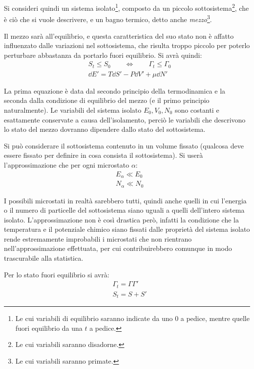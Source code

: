 Si consideri quindi un sistema isolato\footnote{Le cui variabili di equilibrio saranno indicate da uno $0$ a pedice, mentre quelle fuori equilibrio da una $t$ a pedice.}, composto da un piccolo sottosistema\footnote{Le cui variabili saranno disadorne.}, che è ciò che si vuole descrivere, e un bagno termico, detto anche \textit{mezzo}\footnote{Le cui variabili saranno primate.}.
\newline

Il mezzo sarà all'equilibrio, e questa caratteristica del suo stato non è affatto influenzato dalle variazioni nel sottosistema, che risulta troppo piccolo per poterlo perturbare abbastanza da portarlo fuori equilibrio.
Si avrà quindi:
\begin{align*}
&S_t \leq S_0	\qquad \iff \qquad	\Gamma_t \leq \Gamma_0\\
&\dd E' = T \dd S' - P \dd V' + \mu 	\dd N'
\end{align*}

\noindent La prima equazione è data dal secondo principio della termodinamica e la seconda dalla condizione di equilibrio del mezzo (e il primo principio naturalmente). Le variabili del sistema isolato $E_0, V_0, N_0$ sono costanti e esattamente conservate a causa dell'isolamento, perciò le variabili che descrivono lo stato del mezzo dovranno dipendere dallo stato del sottosistema.

Si può considerare il sottosistema contenuto in un volume fissato (qualcosa deve essere fissato per definire in cosa consista il sottosistema). Si userà l'approssimazione che per ogni microstato $\alpha$:
\begin{align*}
&E_\alpha \ll E_0\\
&N_\alpha \ll N_0
\end{align*}

\noindent I possibili microstati in realtà sarebbero tutti, quindi anche quelli in cui l'energia o il numero di particelle del sottosistema siano uguali a quelli dell'intero sistema isolato. L'approssimazione non è così drastica però, infatti la condizione che la temperatura e il potenziale chimico siano fissati dalle proprietà del sistema isolato rende estremamente improbabili i microstati che non rientrano nell'approssimazione effettuata, per cui contribuirebbero comunque in modo trascurabile alla statistica.

Per lo stato fuori equilibrio si avrà:
\begin{align*}
&\Gamma_t = \Gamma \Gamma'\\
&S_t = S + S'
\end{align*}

